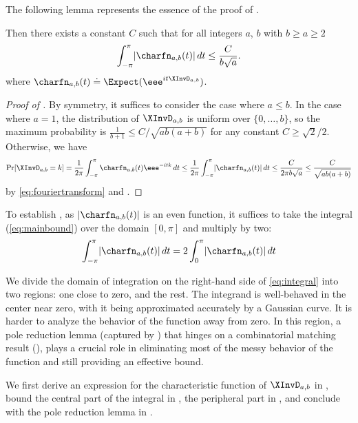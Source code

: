 \documentclass{toc}
\begin{document}
The following lemma represents the essence of the proof of 
 .
\begin{lemma}
    \label{thm:integral}
    Then there exists a constant $C$ such that for all integers $a$, $b$ with $b \ge a \ge 2$
      \begin{equation}
        \label{eq:mainbound}
        \int_{-\pi}^{\pi} \lvert \charfn_{a,b}(t)\rvert\,dt \le \frac{C}{b\sqrt{a}}.
    \end{equation}  
where $\charfn_{a,b}(t) \doteq \Expect(\eee^{it\XInvD_{a,b}})$. 
\end{lemma}
\begin{proof}[Proof of ]
By symmetry, it suffices to consider the case where $a \le b$. In the case where $a=1$, the distribution of $\XInvD_{a,b}$ is uniform over $\{0,\dots,b\}$, so the maximum probability is $\frac{1}{b+1} \le C/\sqrt{ab(a+b)}$ for any constant $C \ge \sqrt{2}/2$. Otherwise, 
we have
\[ \Pr[\XInvD_{a,b}=k] = \frac{1}{2\pi} \int_{-\pi}^{\pi}\charfn_{a,b}(t)\eee^{-itk}\,dt \le \frac{1}{2\pi} \int_{-\pi}^{\pi} \lvert\charfn_{a,b}(t)\rvert\,dt \le \frac{C}{2\pi b\sqrt{a}} \le \frac{C}{\sqrt{ab(a+b)}} \]
by \eqref{eq:fouriertransform} and .
\end{proof}

To establish , as $\lvert \charfn_{a,b}(t) \rvert$ is an even function, it suffices to take the integral (\ref{eq:mainbound}) over the domain $[0,\pi]$ and multiply by two: 
\begin{equation}
    \label{eq:integral}
    \int_{-\pi}^{\pi} \lvert \charfn_{a,b}(t)\rvert\,dt 
    = 2 \int_0^{\pi} \lvert \charfn_{a,b}(t)\rvert\,dt 
\end{equation}  

We divide the domain of integration on the right-hand side of \eqref{eq:integral} into two regions: one close to zero, and the rest. The integrand is well-behaved in the center near zero, with it being approximated accurately by a Gaussian curve. It is harder to analyze the behavior of the function away from zero. In this region, a pole reduction lemma (captured by ) that hinges on a combinatorial matching result (), plays a crucial role in eliminating most of the messy behavior of the function and still providing an effective bound.

We first derive an expression for the characteristic function of $\XInvD_{a,b}$ in , bound the central part of the integral in , the peripheral part in , and conclude with the pole reduction lemma in .
\end{document}

